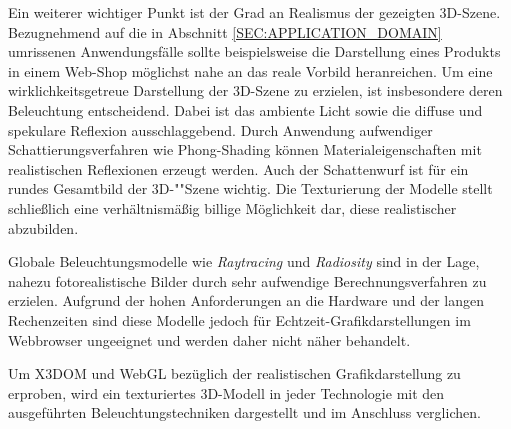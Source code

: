Ein weiterer wichtiger Punkt ist der Grad an Realismus der gezeigten 3D-Szene. Bezugnehmend auf die in Abschnitt \ref{SEC:APPLICATION_DOMAIN} umrissenen Anwendungsfälle sollte beispielsweise die Darstellung eines Produkts in einem Web-Shop möglichst nahe an das reale Vorbild heranreichen. Um eine wirklichkeitsgetreue Darstellung der 3D-Szene zu erzielen, ist insbesondere deren Beleuchtung entscheidend. Dabei ist das ambiente Licht sowie die diffuse und spekulare Reflexion ausschlaggebend. Durch Anwendung aufwendiger Schattierungsverfahren wie Phong-Shading können Materialeigenschaften mit realistischen Reflexionen erzeugt werden. Auch der Schattenwurf ist für ein rundes Gesamtbild der 3D-""Szene wichtig. Die Texturierung der Modelle stellt schließlich eine verhältnismäßig billige Möglichkeit dar, diese realistischer abzubilden.

Globale Beleuchtungsmodelle wie \emph{Raytracing} und \emph{Radiosity} sind in der Lage, nahezu fotorealistische Bilder durch sehr aufwendige Berechnungsverfahren zu erzielen. Aufgrund der hohen Anforderungen an die Hardware und der langen Rechenzeiten sind diese Modelle jedoch für Echtzeit-Grafikdarstellungen im Webbrowser ungeeignet und werden daher nicht näher behandelt.

Um X3DOM und WebGL bezüglich der realistischen Grafikdarstellung zu erproben, wird ein texturiertes 3D-Modell in jeder Technologie mit den ausgeführten Beleuchtungstechniken dargestellt und im Anschluss verglichen.
